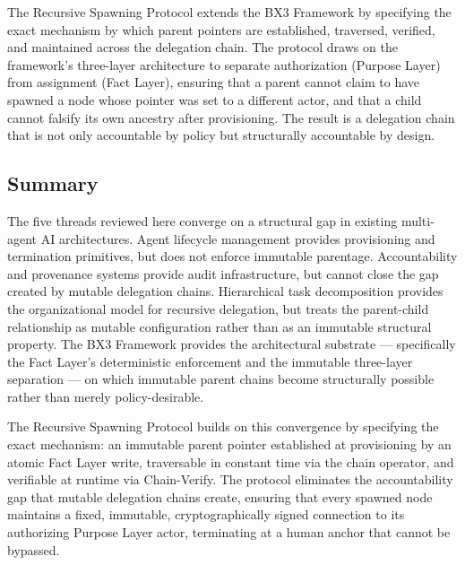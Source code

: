 The Recursive Spawning Protocol extends the BX3 Framework by specifying the exact mechanism by which parent pointers are established, traversed, verified, and maintained across the delegation chain. The protocol draws on the framework's three-layer architecture to separate authorization (Purpose Layer) from assignment (Fact Layer), ensuring that a parent cannot claim to have spawned a node whose pointer was set to a different actor, and that a child cannot falsify its own ancestry after provisioning. The result is a delegation chain that is not only accountable by policy but structurally accountable by design.

\subsection{Summary}
\label{sec:background-summary}

The five threads reviewed here converge on a structural gap in existing multi-agent AI architectures. Agent lifecycle management provides provisioning and termination primitives, but does not enforce immutable parentage. Accountability and provenance systems provide audit infrastructure, but cannot close the gap created by mutable delegation chains. Hierarchical task decomposition provides the organizational model for recursive delegation, but treats the parent-child relationship as mutable configuration rather than as an immutable structural property. The BX3 Framework provides the architectural substrate — specifically the Fact Layer's deterministic enforcement and the immutable three-layer separation — on which immutable parent chains become structurally possible rather than merely policy-desirable.

The Recursive Spawning Protocol builds on this convergence by specifying the exact mechanism: an immutable parent pointer established at provisioning by an atomic Fact Layer write, traversable in constant time via the chain operator, and verifiable at runtime via Chain-Verify. The protocol eliminates the accountability gap that mutable delegation chains create, ensuring that every spawned node maintains a fixed, immutable, cryptographically signed connection to its authorizing Purpose Layer actor, terminating at a human anchor that cannot be bypassed.